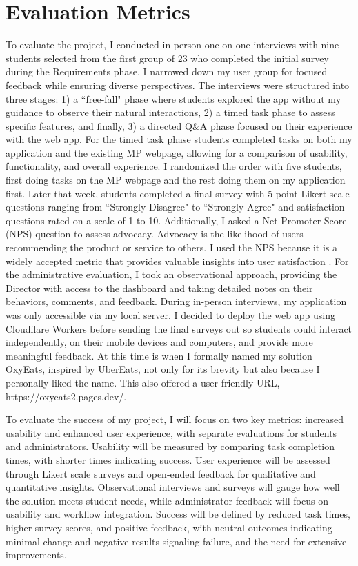 \documentclass[10pt,twocolumn]{article}
\begin{document}
\section{Evaluation Metrics}
To evaluate the project, I conducted in-person one-on-one interviews with nine students selected from the first group of 23 who completed the initial survey during the Requirements phase. I narrowed down my user group for focused feedback while ensuring diverse perspectives. The interviews were structured into three stages: 1) a ``free-fall" phase where students explored the app without my guidance to observe their natural interactions, 2) a timed task phase to assess specific features, and finally, 3) a directed Q\&A phase focused on their experience with the web app. For the timed task phase students completed tasks on both my application and the existing MP webpage, allowing for a comparison of usability, functionality, and overall experience. I randomized the order with five students, first doing tasks on the MP webpage and the rest doing them on my application first. Later that week, students completed a final survey with 5-point Likert scale questions ranging from ``Strongly Disagree" to ``Strongly Agree" and satisfaction questions rated on a scale of 1 to 10. Additionally, I asked a Net Promoter Score (NPS) question to assess advocacy. Advocacy is the likelihood of users recommending the product or service to others. I used the NPS because it is a widely accepted metric that provides valuable insights into user satisfaction \cite{NPS}. For the administrative evaluation, I took an observational approach, providing the Director with access to the dashboard and taking detailed notes on their behaviors, comments, and feedback. During in-person interviews, my application was only accessible via my local server. I decided to deploy the web app using Cloudflare Workers before sending the final surveys out so students could interact independently, on their mobile devices and computers, and provide more meaningful feedback. At this time is when I formally named my solution OxyEats, inspired by UberEats, not only for its brevity but also because I personally liked the name. This also offered a user-friendly URL, https://oxyeats2.pages.dev/. 

To evaluate the success of my project, I will focus on two key metrics: increased usability and enhanced user experience, with separate evaluations for students and administrators. Usability will be measured by comparing task completion times, with shorter times indicating success. User experience will be assessed through Likert scale surveys and open-ended feedback for qualitative and quantitative insights. Observational interviews and surveys will gauge how well the solution meets student needs, while administrator feedback will focus on usability and workflow integration. Success will be defined by reduced task times, higher survey scores, and positive feedback, with neutral outcomes indicating minimal change and negative results signaling failure, and the need for extensive improvements.
\end{document}
